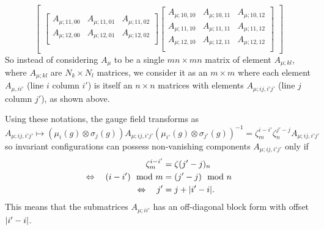 {\begin{equation}
\begin{bmatrix}
\begin{bmatrix}
                    A_{\mu;11,00} & A_{\mu;11,01} & A_{\mu;11,02}\\
                    A_{\mu;12,00} & A_{\mu;12,01} & A_{\mu;12,02}\\
                \end{bmatrix}
                \begin{bmatrix}
                A_{\mu;10,10} & A_{\mu;10,11} & A_{\mu;10,12}\\
                A_{\mu;11,10} & A_{\mu;11,11} & A_{\mu;11,12}\\
                A_{\mu;12,10} & A_{\mu;12,11} & A_{\mu;12,12}\\
            \end{bmatrix}
            \end{bmatrix}
        \end{equation}}
        So instead of considering $A_\mu$ to be a single $mn\times mn$ matrix of element $A_{\mu;kl}$, where $A_{\mu;kl}$ are $N_k\times N_l$ matrices, we consider it as an $m\times m$ where each element $A_{\mu,ii'}$ (line $i$ column $i'$) is itself an $n\times n$ matrices with elements $A_{\mu;ij,i'j'}$ (line $j$ column $j'$), as shown above.

        Using these notations, the gauge field transforms as
        \begin{equation}
            A_{\mu;ij,i'j'} \mapsto (\mu_i(g)\otimes\sigma_j(g))A_{\mu;ij,i'j'}(\mu_{i'}(g)\otimes\sigma_{j'}(g))^{-1} = \zeta^{i-i'}_m\zeta^{j'-j}_n A_{\mu;ij,i'j'}
        \end{equation}
        so invariant configurations can possess non-vanishing components $A_{\mu;ij,i'j'}$ only if
        \begin{align}
            \zeta^{i-i'}_m &= \zeta(j'-j)_n \\
            \Leftrightarrow\quad (i-i')\mod m &= (j'-j)\mod n \\
            \Leftrightarrow\quad j' &= j+\abs{i'-i}.
        \end{align}
        This means that the submatrices $A_{\mu;ii'}$ has an off-diagonal block form with offset $\abs{i'-i}$.

